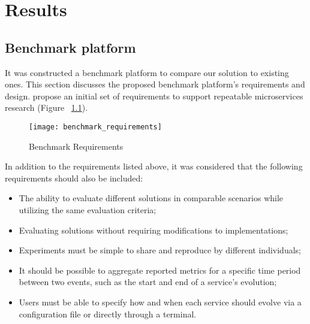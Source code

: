 
%

\chapter{Results}
\label{cha:results}

\section{Benchmark platform} %
\label{sec:benchmark_platform}

It was constructed a benchmark platform to compare our solution to existing ones.
This section discusses the proposed benchmark platform's requirements and design.
\citeauthor{microservices2017benchmark} \cite{microservices2017benchmark} propose an initial set of requirements
to support repeatable microservices research (Figure ~\ref{fig:benchmark}).

\begin{figure}[htbp]
    \centering
    \texttt{[image: benchmark\_requirements]}
    \caption{Benchmark Requirements \cite{microservices2017benchmark}}
    \label{fig:benchmark}
\end{figure}

In addition to the requirements listed above, it was considered that the following requirements should also be included:
\begin{itemize}
    \setlength\itemsep{0em}
    \item The ability to evaluate different solutions in comparable scenarios while utilizing the same evaluation criteria;
    \item Evaluating solutions without requiring modifications to implementations;
    \item Experiments must be simple to share and reproduce by different individuals;
    \item It should be possible to aggregate reported metrics for a specific time period between two events, such as the start and end of a service's evolution;
    \item Users must be able to specify how and when each service should evolve via a configuration file or directly through a terminal.
\end{itemize}

